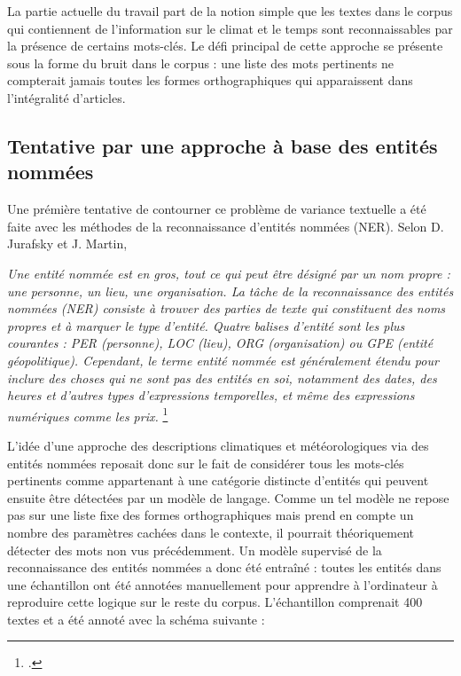 \documentclass[a4paper,twoside,12pt]{article}
\begin{document}
La partie actuelle du travail part de la notion simple que les textes dans le corpus qui contiennent de l'information sur le climat et le temps sont reconnaissables par la présence de certains mots-clés. Le défi principal de cette approche se présente sous la forme du bruit dans le corpus : une liste des mots pertinents ne compterait jamais toutes les formes orthographiques qui apparaissent dans l'intégralité d'articles.

\subsection{Tentative par une approche à base des entités nommées}\label{NER_approach}

Une prémière tentative de contourner ce problème de variance textuelle a été faite avec les méthodes de la reconnaissance d'entités nommées (NER). Selon D. Jurafsky et J. Martin, 

\begin{displayquote} \textit{Une entité nommée est en gros, tout ce qui peut être désigné par un nom propre : une personne, un lieu, une organisation. La tâche de la reconnaissance des entités nommées (NER) consiste à trouver des parties de texte qui constituent des noms propres et à marquer le type d'entité. Quatre balises d'entité sont les plus courantes : PER (personne), LOC (lieu), ORG (organisation) ou GPE (entité géopolitique). Cependant, le terme entité nommée est généralement étendu pour inclure des choses qui ne sont pas des entités en soi, notamment des dates, des heures et d'autres types d'expressions temporelles, et même des expressions numériques comme les prix.}
\footcite[153]{jurafsky_speech_2020}\end{displayquote}

\label{NER_model}
L'idée d'une approche des descriptions climatiques et météorologiques via des entités nommées reposait donc sur le fait de considérer tous les mots-clés pertinents comme appartenant à une catégorie distincte d'entités qui peuvent ensuite être détectées par un modèle de langage. Comme un tel modèle ne repose pas sur une liste fixe des formes orthographiques mais prend en compte un nombre des paramètres cachées dans le contexte, il pourrait théoriquement détecter des mots non vus précédemment. Un modèle supervisé de la reconnaissance des entités nommées a donc été entraîné : toutes les entités dans une échantillon ont été annotées manuellement pour apprendre à l'ordinateur à reproduire cette logique sur le reste du corpus. L'échantillon comprenait 400 textes et a été annoté avec la schéma suivante :
\end{document}
